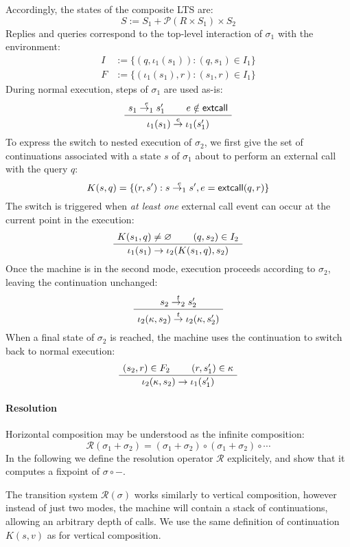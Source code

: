 Accordingly,
the states of the composite LTS are:
\[
  S := S_1 + \mathcal{P}(R \times S_1) \times S_2
\]
Replies and queries
correspond to the top-level interaction of $\sigma_1$ with the environment:
\begin{align*}
  I &:= \{ (q, \iota_1(s_1)) : (q, s_1) \in I_1 \} \\
  F &:= \{ (\iota_1(s_1), r) : (s_1, r) \in I_1 \}
\end{align*}
During normal execution,
steps of $\sigma_1$ are used as-is:
\[
  \AxiomC{$s_1 \stackrel{e}{\rightarrow_1} s_1'$}
  \AxiomC{$e \notin \kw{extcall}$}
  \BinaryInfC{$\iota_1(s_1) \stackrel{e}{\rightarrow} \iota_1(s_1')$}
  \DisplayProof
\]
To express the switch to nested execution of $\sigma_2$,
we first give the set of continuations associated with a state $s$ of $\sigma_1$
about to perform an external call with the query $q$:
\[
  K(s, q) =
    \{ (r, s') : s \stackrel{e}{\rightarrow_1} s',
                     e =  \textsf{extcall} (q, r) \}
\]
The switch is triggered when \emph{at least one} external call event
can occur at the current point in the execution:
\[
  \AxiomC{$K(s_1, q) \ne \varnothing$}
  \AxiomC{$(q, s_2) \in I_2$}
  \BinaryInfC{$\iota_1(s_1) \rightarrow \iota_2(K(s_1, q), s_2)$}
  \DisplayProof
\]
Once the machine is in the second mode,
execution proceeds according to $\sigma_2$,
leaving the continuation unchanged:
\[
  \AxiomC{$s_2 \stackrel{t}{\rightarrow_2} s_2'$}
  \UnaryInfC{$
    \iota_2(\kappa, s_2)
    \stackrel{t}{\rightarrow}
    \iota_2(\kappa, s_2')$}
  \DisplayProof
\]
When a final state of $\sigma_2$ is reached,
the machine uses the continuation to switch back
to normal execution:
\[
  \AxiomC{$(s_2, r) \in F_2$}
  \AxiomC{$(r, s_1') \in \kappa$}
  \BinaryInfC{$\iota_2(\kappa, s_2) \rightarrow \iota_1(s_1')$}
  \DisplayProof
\]


\paragraph{Resolution} %

Horizontal composition may be understood as the infinite composition:
\[
  \mathcal{R}(\sigma_1 + \sigma_2) =
    (\sigma_1 + \sigma_2) \circ (\sigma_1 + \sigma_2) \circ \cdots
\]
In the following
we define the resolution operator $\mathcal{R}$ explicitely,
and show that it computes a fixpoint of $\sigma \circ -$.

The transition system $\mathcal{R}(\sigma)$
works similarly to vertical composition,
however instead of just two modes,
the machine will contain a stack of continuations,
allowing an arbitrary depth of calls.
We use the same definition of continuation $K(s, v)$
as for vertical composition.

